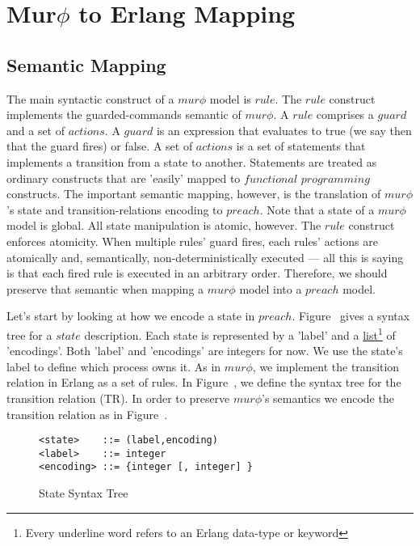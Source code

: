 \chapter{Mur$\phi$ to Erlang Mapping}

\section{Semantic Mapping}

The main syntactic construct of a $mur\phi$ model is $rule$. The $rule$ 
construct implements
the guarded-commands semantic of $mur\phi$. A $rule$ comprises a $guard$ and a set
of $actions$. A $guard$ is an expression that evaluates to true (we say then that the 
guard fires) or false. A set of $actions$ is a set of statements that implements
a transition from a state to another. Statements are treated as ordinary constructs
that are 'easily' mapped to $functional$ $programming$ constructs. The important
semantic mapping, however, is the translation of $mur\phi$'s state and 
transition-relations encoding to $preach$.
Note that a state of a $mur\phi$ model is global. All state manipulation is atomic, 
however.
The $rule$ construct enforces atomicity. When multiple rules' guard fires, each
rules' actions are atomically and, semantically, non-deterministically executed --- 
all this is saying is that each fired rule is executed in an arbitrary order.
Therefore, we should preserve that semantic when mapping a $mur\phi$ model into
a $preach$ model.

Let's start by looking at how we encode a state in $preach$. Figure~\label{Sst} gives
a syntax tree for a $state$ description. Each state is represented by a 'label'
and a \underline{list}\footnote{Every underline word refers to an Erlang data-type or
keyword} 
 of 'encodings'. Both 'label' and 'encodings' are integers for now. We use the 
state's label to define which process owns it. 
As in  $mur\phi$, we implement the transition relation in Erlang as a set of rules.
In Figure~\label{TRst}, we define the syntax tree for the transition relation (TR). 
In order to preserve $mur\phi$'s semantics we encode the transition relation as
in Figure~\label{TRerl}.

\begin{figure}
\begin{verbatim} 
<state>    ::= (label,encoding)
<label>    ::= integer
<encoding> ::= {integer [, integer] }
\end{verbatim}
\caption{State Syntax Tree}
\label{Sst}
\end{figure}


